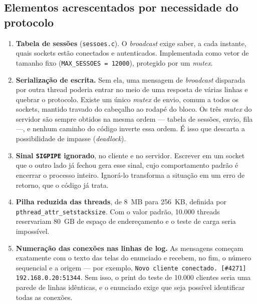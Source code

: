 \documentclass[12pt,a4paper]{article}
\begin{document}
\subsection{Elementos acrescentados por necessidade do protocolo}

\begin{enumerate}
  \item \textbf{Tabela de sessões} (\texttt{sessoes.c}). O \textit{broadcast}
        exige saber, a cada instante, quais sockets estão conectados e
        autenticados. Implementada como vetor de tamanho fixo
        (\texttt{MAX\_SESSOES = 12000}), protegido por um \textit{mutex}.

  \item \textbf{Serialização de escrita.} Sem ela, uma mensagem de
        \textit{broadcast} disparada por outra thread poderia entrar no meio de
        uma resposta de várias linhas e quebrar o protocolo. Existe um único
        \textit{mutex} de envio, comum a todos os sockets, mantido travado do
        cabeçalho ao rodapé do bloco. Os três \textit{mutex} do servidor são
        sempre obtidos na mesma ordem --- tabela de sessões, envio, fila ---, e
        nenhum caminho do código inverte essa ordem. É isso que descarta a
        possibilidade de impasse (\textit{deadlock}).

  \item \textbf{Sinal \texttt{SIGPIPE} ignorado}, no cliente e no servidor.
        Escrever em um socket que o outro lado já fechou gera esse sinal, cujo
        comportamento padrão é encerrar o processo inteiro. Ignorá-lo transforma
        a situação em um erro de retorno, que o código já trata.

  \item \textbf{Pilha reduzida das threads}, de 8~MB para 256~KB, definida por
        \texttt{pthread\_attr\_setstacksize}. Com o valor padrão, 10.000 threads
        reservariam 80~GB de espaço de endereçamento e o teste de carga seria
        impossível.

  \item \textbf{Numeração das conexões nas linhas de log.} As mensagens começam
        exatamente com o texto das telas do enunciado e recebem, no fim, o
        número sequencial e a origem --- por exemplo,
        \texttt{Novo cliente conectado. [\#4271] 192.168.0.20:51344}. Sem isso,
        o print do teste de 10.000 clientes seria uma parede de linhas
        idênticas, e o enunciado exige que seja possível identificar todas as
        conexões.
\end{enumerate}
\end{document}
